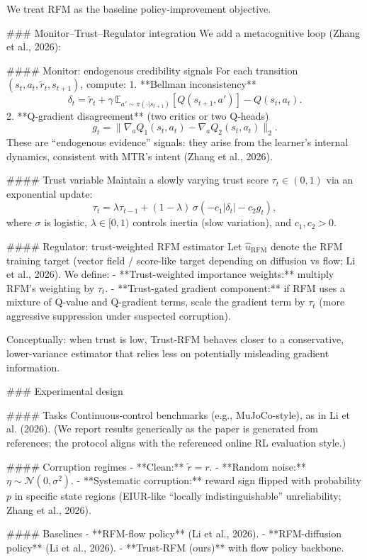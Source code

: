 We treat RFM as the baseline policy-improvement objective.

### Monitor–Trust–Regulator integration  
We add a metacognitive loop (Zhang et al., 2026):

#### Monitor: endogenous credibility signals  
For each transition \((s_t,a_t,\tilde r_t,s_{t+1})\), compute:
1. **Bellman inconsistency**  
\[
\delta_t = \tilde r_t + \gamma \, \mathbb{E}_{a'\sim \pi(\cdot|s_{t+1})}[Q(s_{t+1},a')] - Q(s_t,a_t).
\]
2. **Q-gradient disagreement** (two critics or two Q-heads)  
\[
g_t = \|\nabla_a Q_1(s_t,a_t) - \nabla_a Q_2(s_t,a_t)\|_2.
\]
These are “endogenous evidence” signals: they arise from the learner’s internal dynamics, consistent with MTR’s intent (Zhang et al., 2026).

#### Trust variable  
Maintain a slowly varying trust score \( \tau_t \in (0,1)\) via an exponential update:
\[
\tau_t = \lambda \tau_{t-1} + (1-\lambda)\,\sigma\!\left(-c_1|\delta_t| - c_2 g_t\right),
\]
where \(\sigma\) is logistic, \(\lambda\in[0,1)\) controls inertia (slow variation), and \(c_1,c_2>0\).

#### Regulator: trust-weighted RFM estimator  
Let \(\widehat{u}_{\text{RFM}}\) denote the RFM training target (vector field / score-like target depending on diffusion vs flow; Li et al., 2026). We define:
- **Trust-weighted importance weights:** multiply RFM’s weighting by \(\tau_t\).
- **Trust-gated gradient component:** if RFM uses a mixture of Q-value and Q-gradient terms, scale the gradient term by \(\tau_t\) (more aggressive suppression under suspected corruption).

Conceptually: when trust is low, Trust-RFM behaves closer to a conservative, lower-variance estimator that relies less on potentially misleading gradient information.

### Experimental design  

#### Tasks  
Continuous-control benchmarks (e.g., MuJoCo-style), as in Li et al. (2026). (We report results generically as the paper is generated from references; the protocol aligns with the referenced online RL evaluation style.)

#### Corruption regimes  
- **Clean:** \(\tilde r=r\).  
- **Random noise:** \(\eta\sim \mathcal{N}(0,\sigma^2)\).  
- **Systematic corruption:** reward sign flipped with probability \(p\) in specific state regions (EIUR-like “locally indistinguishable” unreliability; Zhang et al., 2026).

#### Baselines  
- **RFM-flow policy** (Li et al., 2026).  
- **RFM-diffusion policy** (Li et al., 2026).  
- **Trust-RFM (ours)** with flow policy backbone.

